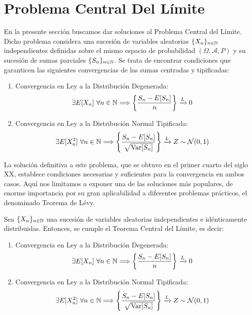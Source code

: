 \section{Problema Central Del Límite}

En la presente sección buscamos dar soluciones al Problema Central del Límite. Dicho problema considera una sucesión de variables aleatorias $\{X_n\}_{n\in \mathbb{N}}$ independientes definidas sobre el mismo espacio de probabilidad $(\Omega, \mathcal{A}, P)$ y su sucesión de sumas parciales $\{S_n\}_{n\in \mathbb{N}}$. Se trata de encontrar condiciones que garanticen las siguientes convergencias de las sumas centradas y tipificadas:
\begin{enumerate}
    \item Convergencia en Ley a la Distribución Degenerada:
    \begin{equation*}
        \exists E[X_n]~\forall n\in \mathbb{N}\Longrightarrow \left\{\frac{S_n - E[S_n]}{n}\right\} \xrightarrow{L} 0
    \end{equation*}
    \item Convergencia en Ley a la Distribución Normal Tipificada:
    \begin{equation*}
        \exists E[X_n^2]~\forall n\in \mathbb{N}\Longrightarrow \left\{\frac{S_n - E[S_n]}{\sqrt{\operatorname{Var}[S_n]}}\right\} \xrightarrow{L} Z\sim \mathcal{N}(0,1)
    \end{equation*}
\end{enumerate}

La solución definitiva a este problema, que se obtuvo en el primer cuarto del siglo XX, establece condiciones necesarias y suficientes para la convergencia en ambos casos. Aquí nos limitamos a exponer una de las soluciones más populares, de enorme importancia por su gran aplicabilidad a diferentes problemas prácticos, el denominado Teorema de Lévy.
\begin{teo}
    Sea $\{X_n\}_{n\in \mathbb{N}}$ una sucesión de variables aleatorias independientes e idénticamente distribuidas. Entonces, se cumple el Teorema Central del Límite, es decir:
    \begin{enumerate}
        \item Convergencia en Ley a la Distribución Degenerada:
        \begin{equation*}
            \exists E[X_n]~\forall n\in \mathbb{N}\Longrightarrow \left\{\frac{S_n - E[S_n]}{n}\right\} \xrightarrow{L} 0
        \end{equation*}
        \item Convergencia en Ley a la Distribución Normal Tipificada:
        \begin{equation*}
            \exists E[X_n^2]~\forall n\in \mathbb{N}\Longrightarrow \left\{\frac{S_n - E[S_n]}{\sqrt{\operatorname{Var}[S_n]}}\right\} \xrightarrow{L} Z\sim \mathcal{N}(0,1)
        \end{equation*}
    \end{enumerate}
\end{teo}


